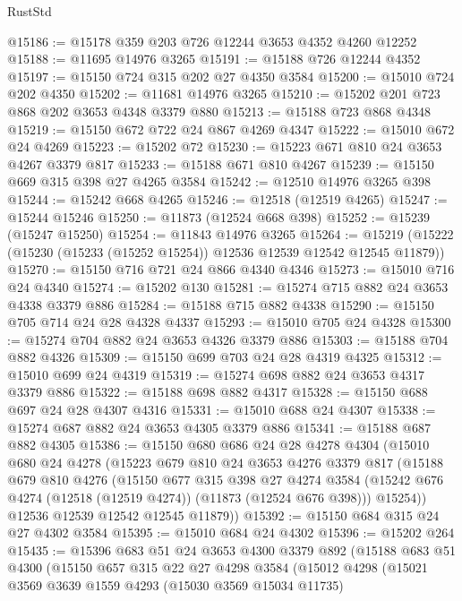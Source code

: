 \begin{lexlean}{RustStd}
\begin{coremodule}
@15186 := @15178 @359 @203 @726 @12244 @3653 @4352 @4260 @12252
@15188 := @11695 @14976 @3265
@15191 := @15188 @726 @12244 @4352
@15197 := @15150 @724 @315 @202 @27 @4350 @3584
@15200 := @15010 @724 @202 @4350
@15202 := @11681 @14976 @3265
@15210 := @15202 @201 @723 @868 @202 @3653 @4348 @3379 @880
@15213 := @15188 @723 @868 @4348
@15219 := @15150 @672 @722 @24 @867 @4269 @4347
@15222 := @15010 @672 @24 @4269
@15223 := @15202 @72
@15230 := @15223 @671 @810 @24 @3653 @4267 @3379 @817
@15233 := @15188 @671 @810 @4267
@15239 := @15150 @669 @315 @398 @27 @4265 @3584
@15242 := @12510 @14976 @3265 @398
@15244 := @15242 @668 @4265
@15246 := @12518 (@12519 @4265)
@15247 := @15244 @15246
@15250 := @11873 (@12524 @668 @398)
@15252 := @15239 (@15247 @15250)
@15254 := @11843 @14976 @3265
@15264 := @15219 (@15222 (@15230 (@15233 (@15252 @15254)) @12536 @12539 @12542 @12545 @11879))
@15270 := @15150 @716 @721 @24 @866 @4340 @4346
@15273 := @15010 @716 @24 @4340
@15274 := @15202 @130
@15281 := @15274 @715 @882 @24 @3653 @4338 @3379 @886
@15284 := @15188 @715 @882 @4338
@15290 := @15150 @705 @714 @24 @28 @4328 @4337
@15293 := @15010 @705 @24 @4328
@15300 := @15274 @704 @882 @24 @3653 @4326 @3379 @886
@15303 := @15188 @704 @882 @4326
@15309 := @15150 @699 @703 @24 @28 @4319 @4325
@15312 := @15010 @699 @24 @4319
@15319 := @15274 @698 @882 @24 @3653 @4317 @3379 @886
@15322 := @15188 @698 @882 @4317
@15328 := @15150 @688 @697 @24 @28 @4307 @4316
@15331 := @15010 @688 @24 @4307
@15338 := @15274 @687 @882 @24 @3653 @4305 @3379 @886
@15341 := @15188 @687 @882 @4305
@15386 := @15150
    @680
    @686
    @24
    @28
    @4278
    @4304
    (@15010
      @680
      @24
      @4278
      (@15223
        @679
        @810
        @24
        @3653
        @4276
        @3379
        @817
        (@15188
          @679
          @810
          @4276
          (@15150
            @677
            @315
            @398
            @27
            @4274
            @3584
            (@15242 @676 @4274 (@12518 (@12519 @4274)) (@11873 (@12524 @676 @398)))
            @15254))
        @12536
        @12539
        @12542
        @12545
        @11879))
@15392 := @15150 @684 @315 @24 @27 @4302 @3584
@15395 := @15010 @684 @24 @4302
@15396 := @15202 @264
@15435 := @15396
    @683
    @51
    @24
    @3653
    @4300
    @3379
    @892
    (@15188
      @683
      @51
      @4300
      (@15150
        @657
        @315
        @22
        @27
        @4298
        @3584
        (@15012
          @4298
          (@15021
            @3569
            @3639
            @1559
            @4293
            (@15030 @3569 @15034 @11735)

\end{coremodule}
\end{lexlean}
